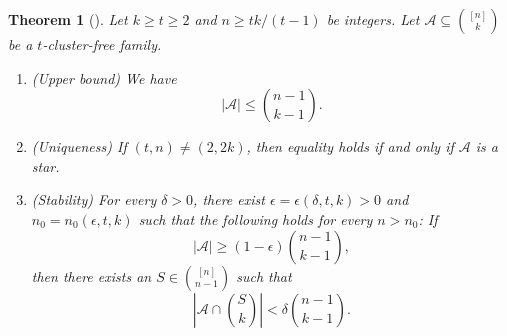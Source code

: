 \documentclass[10pt,a4paper]{amsart}
\numberwithin{equation}{section}
\newtheorem{theorem}{Theorem}[section]
\def\A{\mathcal{A}}
\begin{document}
\begin{theorem}[\cite{Currier,Mubayi2007}]\label{dclusterEKR}
Let $k \geq   t\geq 2$ and $n\geq tk/(t-1)$ be integers.
Let $\A \subseteq \binom{[n]}{k}$ be a  $t$-cluster-free family.
\begin{enumerate}[label={\rm (\alph*)}]

\item {\rm(Upper bound)}
We have
\[
|\A|\leq\binom{n-1}{k-1}.
\]

\item {\rm(Uniqueness)}
If $(t,n)\neq(2,2k)$, then equality holds if and only if
$\A$ is a star.


\item {\rm(Stability)}
For every $\delta>0$, there exist
$\epsilon=\epsilon(\delta,t,k)>0$ and $n_0=n_0(\epsilon,t,k)$
such that the following holds for every $n>n_0$:
If
\[
|\A|\geq
(1-\epsilon)\binom{n-1}{k-1},
\]
then there exists an
$S\in\binom{[n]}{n-1}$ such that
\[
\left|\A\cap\binom{S}{k}\right|
<
\delta\binom{n-1}{k-1}.
\]

\end{enumerate}
\end{theorem}


%
%
%
%
\end{document}
